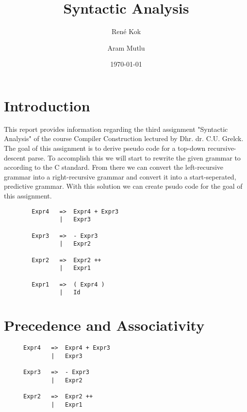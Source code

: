 \documentclass[hidelinks]{uva-inf-article}
\title{Syntactic Analysis}
\author{René Kok}
\author{Aram Mutlu}
\date{\today}
\begin{document}
\maketitle


\section{Introduction}
\begin{flushleft}
\par This report provides information regarding the third assignment 
     "Syntactic Analysis" of the course Compiler Construction lectured by Dhr. dr. C.U. Grelck. 
     The goal of this assignment is to derive pseudo code for a top-down recursive-descent parse. 
     To accomplish this we will start to rewrite the given grammar to according to the C standard. 
     From there we can convert the left-recursive grammar into a right-recursive grammar and convert it into a start-seperated, predictive grammar.
     With this solution we can create psudo code for the goal of this assignment.
     
     \begin{lstlisting}
        Expr4   =>  Expr4 + Expr3 
                |   Expr3
        
        Expr3   =>  - Expr3 
                |   Expr2
        
        Expr2   =>  Expr2 ++ 
                |   Expr1
                
        Expr1   =>  ( Expr4 ) 
                |   Id
        \end{lstlisting}

\section{Precedence and Associativity}
\begin{figure}[h]
\begin{lstlisting}
Expr4   =>  Expr4 + Expr3 
        |   Expr3

Expr3   =>  - Expr3 
        |   Expr2

Expr2   =>  Expr2 ++ 
        |   Expr1
        

\end{lstlisting}
\end{figure}
\end{flushleft}
\end{document}
